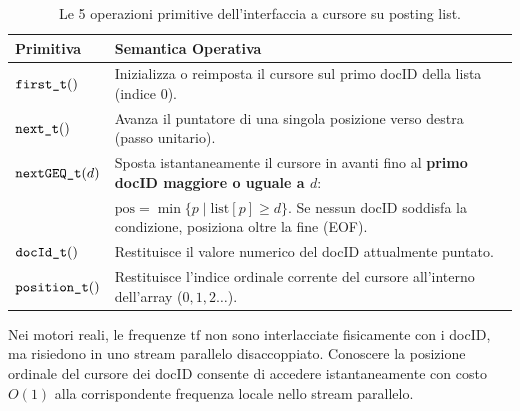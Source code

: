 \begin{table}[H]
\centering
\small
\begin{tabularx}{\linewidth}{l Y}
\toprule
\textbf{Primitiva} & \textbf{Semantica Operativa} \\
\midrule
$\text{\texttt{first\_t}}()$ & Inizializza o reimposta il cursore sul primo docID della lista (indice 0). \\
\addlinespace
$\text{\texttt{next\_t}}()$ & Avanza il puntatore di una singola posizione verso destra (passo unitario). \\
\addlinespace
$\text{\texttt{nextGEQ\_t}}(d)$ & Sposta istantaneamente il cursore in avanti fino al \textbf{primo docID maggiore o uguale a $d$}:\\
& $\text{pos} = \min \{ p \mid \text{list}[p] \ge d \}$. Se nessun docID soddisfa la condizione, posiziona oltre la fine (EOF). \\
\addlinespace
$\text{\texttt{docId\_t}}()$ & Restituisce il valore numerico del docID attualmente puntato. \\
\addlinespace
$\text{\texttt{position\_t}}()$ & Restituisce l'indice ordinale corrente del cursore all'interno dell'array ($0, 1, 2 \dots$). \\
\bottomrule
\end{tabularx}
\caption{Le 5 operazioni primitive dell'interfaccia a cursore su posting list.}
\label{tab:primitive-posting-list}
\end{table}

\begin{remark}
Nei motori reali, le frequenze $\text{tf}$ non sono interlacciate fisicamente con i docID, ma risiedono in uno stream parallelo disaccoppiato. Conoscere la posizione ordinale del cursore dei docID consente di accedere istantaneamente con costo $O(1)$ alla corrispondente frequenza locale nello stream parallelo.
\end{remark}

\FloatBarrier
